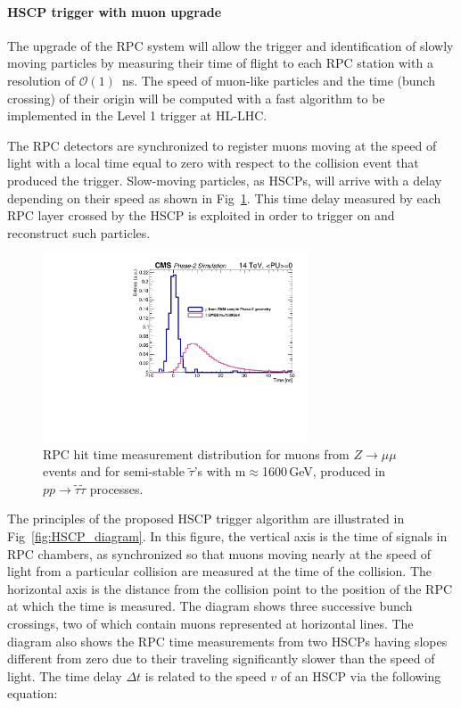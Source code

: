 \paragraph{HSCP trigger with muon upgrade}

The upgrade of the RPC system will allow the trigger and identification of slowly moving particles by measuring their time of flight to each RPC station with a resolution of $\mathcal{O}(1)$~ns. The speed of muon-like particles and the time (bunch crossing) of their origin will be computed with a fast algorithm to be implemented in the Level 1 trigger at HL-LHC. 

The RPC detectors are synchronized to register muons moving at the speed of light with a local time equal to zero with respect to the collision event that produced the trigger. Slow-moving particles, as HSCPs, will arrive with a delay depending on their speed as shown in Fig~\ref{fig:hscp_time}. This time delay measured by each RPC layer crossed by the HSCP is exploited in order to trigger on and reconstruct such particles. 

\begin{figure}[h!tbp]
\begin{center}
  \includegraphics[width=0.7\textwidth]{figures/HSCP/time.pdf}
  \caption{RPC hit time measurement distribution for muons from $Z \to \mu\mu$ events and 
  for semi-stable $\tilde \tau$'s with m$\approx$1600\,GeV, produced in $pp \to \tilde \tau \tilde \tau$ processes. }
  \label{fig:hscp_time}
\end{center}
\end{figure}

The principles of the proposed HSCP trigger algorithm are illustrated in Fig~\ref{fig:HSCP_diagram}. In this figure, the vertical axis is the time of signals in RPC chambers, as synchronized so that muons moving nearly at the speed of light from a particular collision are measured at the time of the collision. The horizontal axis is the distance from the collision point to the position of the RPC at which the time is measured. The diagram shows three successive bunch crossings, two of which contain muons represented at horizontal lines. The diagram also shows the RPC time measurements from two HSCPs having slopes different from zero due to their traveling significantly slower than the speed of light. 
The time delay $\Delta t$ is related to the speed $v$ of an HSCP via the following equation:

